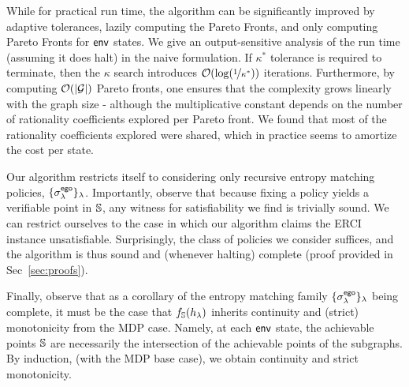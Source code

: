 While for practical run time, the algorithm can be significantly improved by adaptive
tolerances, lazily computing the Pareto Fronts, and only computing
Pareto Fronts for $\mathsf{env}$ states.
We give an output-sensitive analysis of the run time (assuming it does halt) in the naive formulation.
 If $\kappa^*$ tolerance is required to terminate,
then the $\kappa$ search introduces $\mathcal{O}(\log(\nicefrac{1}{\kappa^*}))$
iterations. Furthermore, by computing $\mathcal{O}(|\mathcal{G}|)$ Pareto fronts, one ensures that the complexity grows linearly with the graph
size - although the multiplicative constant depends on the number of
rationality coefficients explored per Pareto front. We found that most
of the rationality coefficients explored were shared, which in
practice seems to amortize the cost per state. 


Our algorithm restricts itself to considering only recursive entropy
matching policies, $\{\sigma^{\mathsf{ego}}_\lambda\}_\lambda$.  Importantly,
observe that because fixing a policy yields a verifiable point in
$\mathbb{S}$, any witness for satisfiability we find is trivially sound. We can restrict ourselves to the case in which our
algorithm claims the ERCI instance unsatisfiable. Surprisingly, the class of policies we consider suffices, and the algorithm 
is thus sound and (whenever halting) complete (proof provided in Sec~\ref{sec:proofs}).

Finally, observe that as a corollary of the entropy matching family
$\{\sigma^{\mathsf{ego}}_\lambda\}_\lambda$ being complete, it must be the case that
$f_\mathbb{S}(h_\lambda)$ inherits continuity and (strict) monotonicity
from the MDP case. Namely, at each $\mathsf{env}$ state, the achievable
points $\mathbb{S}$ are necessarily the intersection of the achievable
points of the subgraphs. By induction, (with the MDP base case), we
obtain continuity and strict monotonicity.


